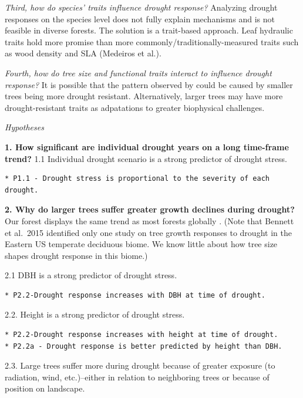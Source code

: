 \documentclass[]{article}
\begin{document}
\emph{Third, how do species' traits influence drought response?}
Analyzing drought responses on the species level does not fully explain
mechanisms and is not feasible in diverse forests. The solution is a
trait-based approach. Leaf hydraulic traits hold more promise than more
commonly/traditionally-measured traits such as wood density and SLA
(Medeiros et al.).

\emph{Fourth, how do tree size and functional traits interact to
influence drought response?} It is possible that the pattern observed by
\citep{bennett_larger_2015} could be caused by smaller trees being more
drought resistant. Alternatively, larger trees may have more
drought-resistant traits as adpatations to greater biophysical
challenges.

\emph{Hypotheses}

\textbf{1. How significant are individual drought years on a long
time-frame trend?} 1.1 Individual drought scenario is a strong predictor
of drought stress.

\begin{verbatim}
* P1.1 - Drought stress is proportional to the severity of each drought.
\end{verbatim}

\textbf{2. Why do larger trees suffer greater growth declines during
drought?} Our forest displays the same trend as most forests globally
\citep{bennett_larger_2015}. (Note that Bennett et al.~2015 identified
only one study on tree growth responses to drought in the Eastern US
temperate deciduous biome. We know little about how tree size shapes
drought response in this biome.)

2.1 DBH is a strong predictor of drought stress.

\begin{verbatim}
* P2.2-Drought response increases with DBH at time of drought.
\end{verbatim}

2.2. Height is a strong predictor of drought stress.

\begin{verbatim}
* P2.2-Drought response increases with height at time of drought.
* P2.2a - Drought response is better predicted by height than DBH.
\end{verbatim}

2.3. Large trees suffer more during drought because of greater exposure
(to radiation, wind, etc.)--either in relation to neighboring trees or
because of position on landscape.
\end{document}
